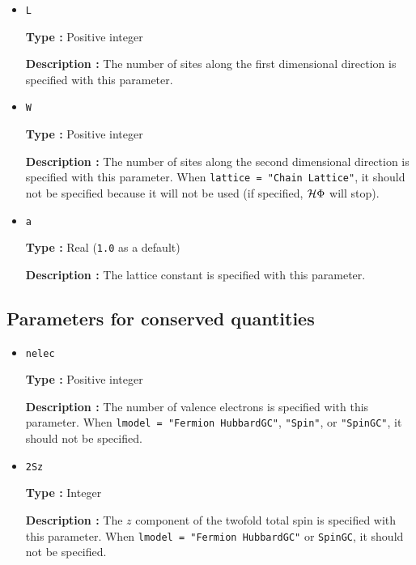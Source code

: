 \begin{itemize}
\item \verb|L|

{\bf Type :} Positive integer

{\bf Description :} The number of
sites along the first dimensional direction
is specified with this parameter.

\item \verb|W|

{\bf Type :} Positive integer

{\bf Description :} The number of
sites along the second dimensional direction
is specified with this parameter.
When \verb|lattice = "Chain Lattice"|, 
it should not be specified because it will not be used
(if specified, $\mathcal{H} \Phi$ will stop).

\item \verb|a|

{\bf Type :} Real (\verb|1.0| as a default)

{\bf Description :} The lattice constant is specified with this parameter.
\end{itemize}

\subsection{Parameters for conserved quantities}

\begin{itemize}
\item \verb|nelec|

{\bf Type :} Positive integer

{\bf Description :} The number of valence electrons is specified with this parameter.
When \verb|lmodel = "Fermion HubbardGC"|, \verb|"Spin"|, or  \verb|"SpinGC"|, 
it should not be specified.

\item \verb|2Sz|

{\bf Type :} Integer

{\bf Description :} The $z$ component of the twofold total spin is 
specified with this parameter.
When \verb|lmodel = "Fermion HubbardGC"| or \verb|SpinGC|,
it should not be specified. 
\end{itemize}

